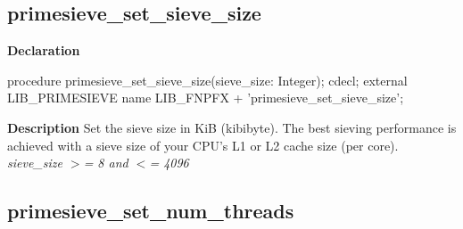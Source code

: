 \documentclass{report}
\newif\ifpdf
\begin{document}
\subsection*{primesieve{\_}set{\_}sieve{\_}size}
\fi
\label{primesieve-primesieve_set_sieve_size}
\begin{list}{}{
\setlength{\itemindent}{0cm}
\setlength{\listparindent}{0cm}
\setlength{\leftmargin}{\evensidemargin}
\addtolength{\leftmargin}{\tmplength}
\settowidth{\labelsep}{X}
\addtolength{\leftmargin}{\labelsep}
\setlength{\labelwidth}{\tmplength}
}
\item[\textbf{Declaration}\hfill]
\ifpdf
\begin{flushleft}
\fi
\begin{ttfamily}
procedure primesieve{\_}set{\_}sieve{\_}size(sieve{\_}size: Integer); cdecl; external LIB{\_}PRIMESIEVE name LIB{\_}FNPFX + 'primesieve{\_}set{\_}sieve{\_}size';\end{ttfamily}

\ifpdf
\end{flushleft}
\fi

\par
\item[\textbf{Description}]
Set the sieve size in KiB (kibibyte). The best sieving performance is achieved with a sieve size of your CPU's L1 or L2 cache size (per core). \textit{sieve{\_}size {$>$}= 8 and {$<$}= 4096}

\end{list}
\ifpdf
\subsection*{\large{\textbf{primesieve{\_}set{\_}num{\_}threads}}\normalsize\hspace{1ex}\hrulefill}
\else
\end{document}
